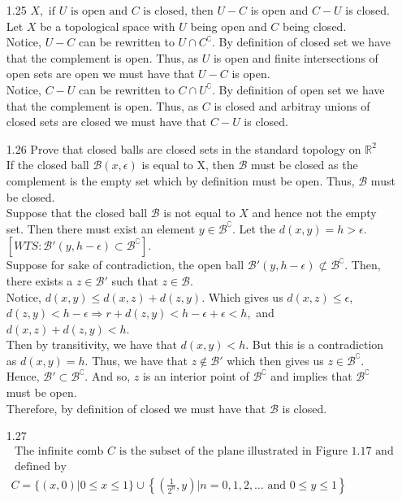 \documentclass[12pt]{article}
\newcommand{\R}{\mathds{R}}
\newcommand{\B}{\mathcal{B}}
\begin{document}
\begin{enumerate}
	\item[1.25]$ X , \text { if } U \text { is open and } C \text { is closed, then } U - C $ is open and $ C-U $ is closed.
	\\ Let $ X $ be a topological space with $ U $ being open and $ C $ being closed.\\
				Notice, $ U-C $ can be rewritten to $ U\cap C^{\complement} $. By definition of closed set we have that the complement is open. Thus, as $ U $ is open and finite intersections of open sets are open we must have that $ U-C $ is open.\\
				Notice, $ C-U $ can be rewritten to $ C\cap U^{\complement} $. By definition of open set we have that the complement is open. Thus, as $ C $ is closed and arbitray unions of closed sets are closed we must have that $ C-U $ is closed.\\
	\item[1.26]Prove that closed balls are closed sets in the standard topology on $ \R^2 $ \\
	If the closed ball $ \B(x,\epsilon)$ is equal to X, then $ \B $ must be closed as the complement is the empty set which by definition must be open. Thus, $ \B $ must be closed. \\
	Suppose that the closed ball $ \B $ is not equal to $ X $ and hence not the empty set.
	Then there must exist an element $ y\in \B^\complement $. Let the $ d(x,y) = h > \epsilon $.\\
	 $[WTS: \B'(y,h-\epsilon) \subset \B^\complement]$.\\
	Suppose for sake of contradiction, the open ball $\B'(y,h-\epsilon) \not\subset \B^\complement$. Then, there exists a $ z\in \B' $ such that $ z\in\B $.\\
	 Notice, $ d(x,y)\leq d(x,z)+d(z,y) $. Which gives us $ d(x,z)\leq \epsilon$, $d(z,y) < h-\epsilon \Rightarrow r+d(z,y)<h-\epsilon+\epsilon<h, $ and $ d(x,z)+d(z,y)<h$.\\
	  Then by transitivity, we have that $d(x,y)<h$. But this is a contradiction as $d(x,y)=h$. Thus, we have that $ z \not\in \B' $ which then gives us $ z\in \B^\complement $. Hence, $ \B' \subset \B^\complement $. And so, $ z $ is an interior point of $ \B^\complement $ and implies that $ \B^\complement $ must be open.\\ Therefore, by definition of closed we must have that $ \B $ is closed.
	\item[1.27]$ \begin{array} { l } { \text { The infinite comb } C \text { is the subset of the plane illustrated in Figure } 1.17 \text { and } } \\ { \text { defined by } } \\ { C = \{ ( x , 0 ) | 0 \leq x \leq 1 \} \cup \left\{ \left( \frac { 1 } { 2 ^ { n } } , y \right) | n = 0,1,2 , \ldots \text { and } 0 \leq y \leq 1 \right\} } \end{array} $\\

\end{enumerate}
\end{document}
